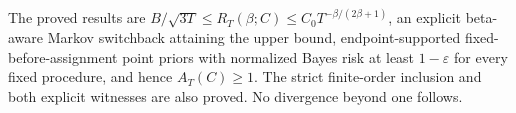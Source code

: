 The proved results are \(B/\sqrt{3T}\le R_T(\beta;C)\le C_0T^{-\beta/(2\beta+1)}\), an explicit beta-aware Markov switchback attaining the upper bound, endpoint-supported fixed-before-assignment point priors with normalized Bayes risk at least \(1-\varepsilon\) for every fixed procedure, and hence \(A_T(C)\ge1\). The strict finite-order inclusion and both explicit witnesses are also proved. No divergence beyond one follows.